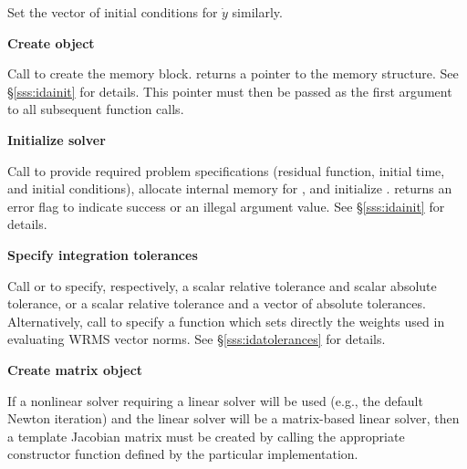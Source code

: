 \begin{Steps}

  Set the vector  of initial conditions for $\dot{y}$ similarly.

\item\label{i:ida_create}
  {\bf Create {\ida} object}

  Call \id{()}
  to create the {\ida} memory block.
   returns a pointer to the {\ida} memory structure.
  See \S\ref{sss:idainit} for details.
  This  pointer must then be passed as the first argument
  to all subsequent {\ida} function calls.

\item\label{i:ida_init}
  {\bf Initialize {\ida} solver}

  Call  to provide required problem
  specifications (residual function, initial time, and initial conditions),
  allocate internal memory for {\ida}, and initialize {\ida}.
   returns an error flag to indicate success or an illegal argument
  value.  See \S\ref{sss:idainit} for details.

\item
  {\bf Specify integration tolerances}

  Call  or 
  to specify, respectively, a scalar relative tolerance and scalar
  absolute tolerance, or a scalar relative tolerance and a vector of
  absolute tolerances.  Alternatively, call  to
  specify a function which sets directly the weights used in
  evaluating WRMS vector norms.  See \S\ref{sss:idatolerances} for
  details.

\item\label{i:matrix}
  {\bf Create matrix object}

  If a nonlinear solver requiring a linear solver will be used (e.g., the
  default Newton iteration) and the linear solver will be a matrix-based linear
  solver, then a template Jacobian matrix must be created by calling the
  appropriate constructor function defined by the particular {\sunmatrix}
  implementation.


\end{Steps}
